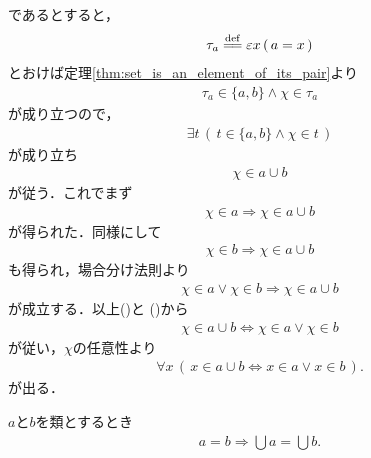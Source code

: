 \begin{sketch}
		であるとすると，
		\begin{align}
			\tau_a \defeq \varepsilon x\, (\, a = x\, )
		\end{align}
		とおけば定理\ref{thm:set_is_an_element_of_its_pair}より
		\begin{align}
			\tau_a \in \{a,b\} \wedge \chi \in \tau_a
		\end{align}
		が成り立つので，
		\begin{align}
			\exists t\, \left(\, t \in \{a,b\} \wedge \chi \in t\, \right)
		\end{align}
		が成り立ち
		\begin{align}
			\chi \in a \cup b
		\end{align}
		が従う．これでまず
		\begin{align}
			\chi \in a \Longrightarrow \chi \in a \cup b
		\end{align}
		が得られた．同様にして
		\begin{align}
			\chi \in b \Longrightarrow \chi \in a \cup b
		\end{align}
		も得られ，場合分け法則より
		\begin{align}
			\chi \in a \vee \chi \in b \Longrightarrow \chi \in a \cup b
			\label{fom:thm_union_of_pair_is_union_of_their_elements_3}
		\end{align}
		が成立する．以上()と
		()から
		\begin{align}
			\chi \in a \cup b \Longleftrightarrow \chi \in a \vee \chi \in b
		\end{align}
		が従い，$\chi$の任意性より
		\begin{align}
			\forall x\, (\, x \in a \cup b \Longleftrightarrow x \in a \vee x \in b\, ).
		\end{align}
		が出る．
		\QED
	\end{sketch}
	
	\begin{screen}
		\begin{thm}[等しい類の合併は等しい]\label{thm:unions_of_equal_classes_are_equal}
			$a$と$b$を類とするとき
			\begin{align}
				a = b \Longrightarrow \bigcup a = \bigcup b.
			\end{align}
		\end{thm}
	\end{screen}
	
